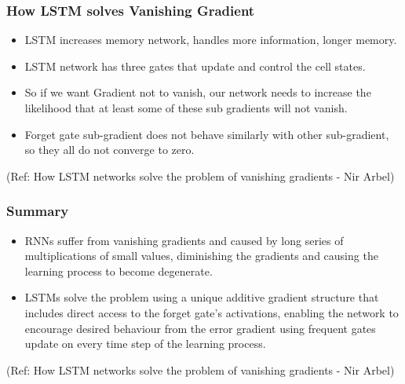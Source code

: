 \begin{frame}[fragile] \frametitle{How LSTM solves Vanishing Gradient}
\begin{itemize}
\item LSTM increases memory network, handles more information, longer memory.
\item LSTM network has three gates that update and control the cell states.
\item So if we want Gradient not to vanish, our network needs to increase the likelihood that at least some of these sub gradients will not vanish.
\item Forget gate sub-gradient does not behave similarly with other sub-gradient, so they all do not converge to zero.
\end{itemize}

{\tiny (Ref: How LSTM networks solve the problem of vanishing gradients
- Nir Arbel)}

\end{frame}

\begin{frame}[fragile] \frametitle{Summary}
\begin{itemize}
\item RNNs suffer from vanishing gradients and caused by long series of multiplications of small values, diminishing the gradients and causing the learning process to become degenerate.
\item LSTMs solve the problem using a unique additive gradient structure that includes direct access to the forget gate’s activations, enabling the network to encourage desired behaviour from the error gradient using frequent gates update on every time step of the learning process.
\end{itemize}

{\tiny (Ref: How LSTM networks solve the problem of vanishing gradients
- Nir Arbel)}

\end{frame}

